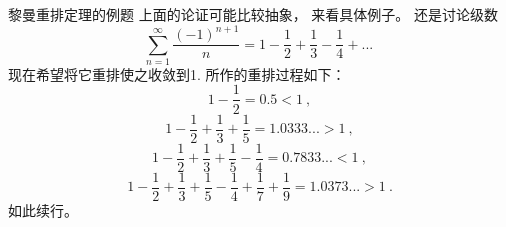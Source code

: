 \begin{example}{黎曼重排定理的例题}
上面的论证可能比较抽象， 来看具体例子。 还是讨论级数
$$
\sum_{n=1}^\infty\frac{(-1)^{n+1}}{n}
=1-\frac{1}{2}+\frac{1}{3}-\frac{1}{4}+...~
$$
现在希望将它重排使之收敛到1. 所作的重排过程如下：
$$
1-\frac{1}{2}=0.5<1~,
$$ 
$$
1-\frac{1}{2}+\frac{1}{3}+\frac{1}{5}=1.0333...>1~,
$$ 
$$
1-\frac{1}{2}+\frac{1}{3}+\frac{1}{5}-\frac{1}{4}=0.7833...<1~,
$$ 
$$
1-\frac{1}{2}+\frac{1}{3}+\frac{1}{5}-\frac{1}{4}+\frac{1}{7}+\frac{1}{9}=1.0373...>1~.
$$
如此续行。
\end{example}